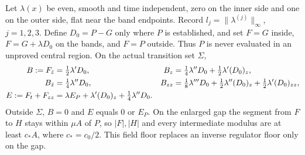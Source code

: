 Let $\lambda(x)$ be even, smooth and time independent, zero on the inner
side and one on the outer side, flat near the band endpoints. Record
$l_j=\|\lambda^{(j)}\|_\infty$, $j=1,2,3$. Define $D_0=P-G$ only
where $P$ is established, and set $F=G$ inside, $F=G+\lambda D_0$
on the bands, and $F=P$ outside. Thus $P$ is never evaluated in an
unproved central region. On the actual transition set $\Sigma$,
\begin{align}
 B:=F_{\bar z}&=\tfrac12\lambda'D_0,&
 B_z&=\tfrac14\lambda''D_0+\tfrac12\lambda'(D_0)_z,\notag\\
 B_{\bar z}&=\tfrac14\lambda''D_0,&
 B_{zz}&=\tfrac18\lambda'''D_0+\tfrac12\lambda''(D_0)_z
                         +\tfrac12\lambda'(D_0)_{zz},\notag\\
 E:=F_t+F_{zz}&=\lambda E_P+\lambda'(D_0)_z
                                     +\tfrac14\lambda''D_0.
 \label{eq:sj-defects}
\end{align}
Outside $\Sigma$, $B=0$ and $E$ equals $0$ or $E_P$. On the enlarged
gap the segment from $F$ to $H$ stays within $\mu A$ of $P$, so
$|F|,|H|$ and every intermediate modulus are at least $c_*A$,
where $c_*=c_0/2$. This field floor replaces an inverse regulator floor
only on the gap.

